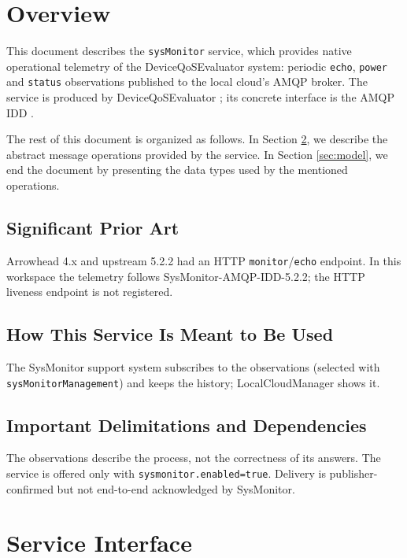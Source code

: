 \documentclass[a4paper]{arrowhead}
\begin{document}
\section{Overview}
\label{sec:overview}

This document describes the \texttt{sysMonitor} service, which provides native operational telemetry of the Device\allowbreak{}Qo\allowbreak{}SEvaluator system: periodic \texttt{echo}, \texttt{power} and \texttt{status} observations published to the local cloud's AMQP broker.
The service is produced by DeviceQoSEvaluator \cite{dqe-sysd}; its concrete interface is the AMQP IDD \cite{dqe-sysMonitor-amqp-idd}.

The rest of this document is organized as follows.
In Section \ref{sec:operations}, we describe the abstract message operations provided by the service.
In Section \ref{sec:model}, we end the document by presenting the data types used by the mentioned operations.

\subsection{Significant Prior Art}

Arrowhead 4.x and upstream 5.2.2 had an HTTP \texttt{monitor}/\texttt{echo} endpoint. In this workspace the telemetry follows SysMonitor-AMQP-IDD-5.2.2; the HTTP liveness endpoint is not registered.

\subsection{How This Service Is Meant to Be Used}

The SysMonitor support system subscribes to the observations (selected with \texttt{sys\allowbreak{}Monitor\allowbreak{}Management}) and keeps the history; LocalCloudManager shows it.

\subsection{Important Delimitations and Dependencies}
\label{sec:delimitations}

The observations describe the process, not the correctness of its answers. The service is offered only with \texttt{sysmonitor.\allowbreak{}enabled=\allowbreak{}true}. Delivery is publisher-confirmed but not end-to-end acknowledged by SysMonitor.

\newpage

\section{Service Interface}
\label{sec:operations}
\end{document}
